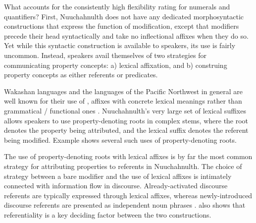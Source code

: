 What accounts for the consistently high flexibility rating for numerals and quantifiers? First, Nuuchahnulth does not have any dedicated morphosyntactic constructions that express the function of modification, except that modifiers precede their head syntactically and take no inflectional affixes when they do so. Yet while this syntactic construction is available to speakers, its use is fairly uncommon. Instead, speakers avail themselves of two strategies for communicating property concepts: a) lexical affixation, and b) construing property concepts as either referents or predicates.

Wakashan languages and the languages of the Pacific Northwest in general are well known for their use of , affixes with concrete lexical meanings rather than grammatical / functional ones \parencite{Mithun1997}.  Nuuchahnulth's very large set of lexical suffixes allows speakers to use property-denoting roots in complex stems, where the root denotes the property being attributed, and the lexical suffix denotes the referent being modified. Example  shows several such uses of property-denoting roots.


\noindent The use of property-denoting roots with lexical affixes is by far the most common strategy for attributing properties to referents in Nuuchahnulth. The choice of strategy between a bare modifier and the use of lexical affixes is intimately connected with information flow in discourse. Already-activated discourse referents are typically expressed through lexical affixes, whereas newly-introduced discourse referents are presented as independent noun phrases . \textcite[144]{Nakayama2001} also shows that referentiality is a key deciding factor between the two constructions.

